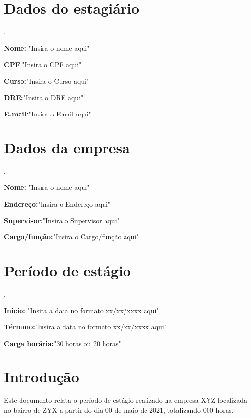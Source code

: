 \documentclass[12pt]{article}%
\begin{document}
\section{Dados do estagiário}
.

\textbf{Nome:} "Insira o nome aqui"
\newline

\textbf{CPF:}"Insira o CPF aqui"
\newline

\textbf{Curso:}"Insira o Curso aqui"
\newline

\textbf{DRE:}"Insira o DRE aqui"
\newline

\textbf{E-mail:}"Insira o Email aqui"
\newline	 


\section{Dados da empresa}
.

\textbf{Nome:} "Insira o nome aqui"
\newline

\textbf{Endereço:}"Insira o Endereço aqui"
\newline

\textbf{Supervisor:}"Insira o Supervisor aqui"
\newline

\textbf{Cargo/função:}"Insira o Cargo/função aqui"
\newline


\section{Período de estágio}
.

\textbf{Inicio:} "Insira a data no formato xx/xx/xxxx aqui"
\newline

\textbf{Término:}"Insira a data no formato xx/xx/xxxx aqui"
\newline

\textbf{Carga horária:}"30 horas ou 20 horas"
\newline

\newpage

\section*{Introdução}     

Este documento relata o período de estágio realizado na empresa XYZ localizada no bairro de ZYX a partir do dia 00 de maio de 2021, totalizando 000 horas. 
\end{document}
